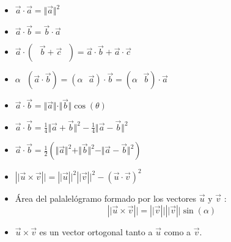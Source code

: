\documentclass[12pt]{article}
\newcommand{\D}{\displaystyle}
\begin{document}
\begin{itemize}
      \item $\vec{a} \cdot \vec{a} = \Vert \vec{a} \Vert ^2$
      \item $\vec{a} \cdot \vec{b} = \vec{b} \cdot \vec{a}$
      \item $\vec{a} \cdot (\mbox{ }\vec{b} + \vec{c}\mbox{ }) = \vec{a} \cdot \vec{b} + \vec{a} \cdot \vec{c}$
      \item $\alpha \mbox{ }(\vec{a}\cdot \vec{b}) = (\alpha \mbox{ }\vec{a})\cdot \vec{b} = (\alpha \mbox{ }\vec{b})\cdot \vec{a}$
      \item $\vec{a} \cdot \vec{b} = \Vert \vec{a} \Vert \cdot \Vert \vec{b} \Vert \cos({\theta})$
      \item $\vec{a}\cdot \vec{b} = \frac{1}{4}\Vert \vec{a} + \vec{b}\Vert ^2 - \frac{1}{4}\Vert \vec{a} - \vec{b}\Vert ^2$
      \item $\vec{a}\cdot \vec{b} = \frac{1}{2}(\Vert \vec{a} \Vert ^2 + \Vert \vec{b} \Vert ^2 - \Vert \vec{a} - \vec{b}\Vert ^2)$
      \item $\left\lvert\lvert \vec{u} \times \vec{v} \right\rvert\rvert = \left\lvert\lvert \vec{u} \right\rvert\rvert^2 \left\lvert\lvert \vec{v} \right\rvert\rvert^2 - (\vec{u} \cdot \vec{v})^2$
      \item \'Area del palalel\'ogramo formado por los vectores $\vec{u} \mbox{ y } \vec{v}$ :
            $$\D \left\lvert\lvert \vec{u} \times \vec{v} \right\rvert\rvert = \left\lvert\lvert
                  \vec{v} \right\rvert\rvert \left\lvert\lvert \vec{v} \right\rvert\rvert \sin({\alpha})$$
      \item $\vec{u} \times \vec{v}$ es un vector ortogonal tanto a $\vec{u}$ como a $\vec{v}$.
\end{itemize}
\end{document}
